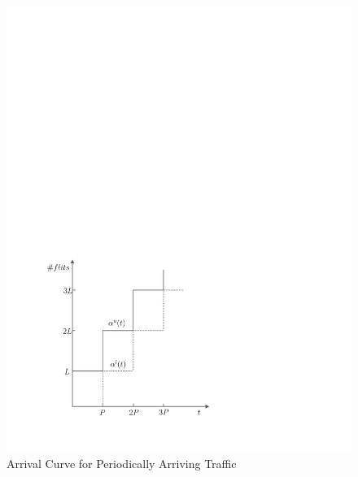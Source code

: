 \documentclass[10pt,journal]{IEEEtran}
\begin{document}
\begin{figure}
  \centering
  \includegraphics[scale=0.5]{figures/AC.pdf}
  \caption{Arrival Curve for Periodically Arriving Traffic}\label{ac}
\end{figure}
\end{document}
